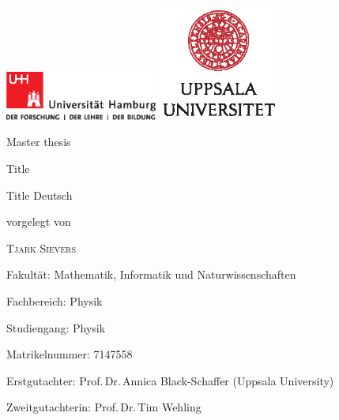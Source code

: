 \documentclass[main.tex]{subfiles}
\begin{document}
\begin{fullsizetitle}
    \vspace{2cm}
    \hspace{0.1\textwidth}
    \vline\hspace{10pt}
    \begin{minipage}[t][0.8\textheight][t]{0.8\textwidth}
        \includegraphics[width=5cm, valign=c]{images/logos/up-uhh-logo-u-2010-u-farbe-u-cmyk}
        \includegraphics[width=4cm, valign=c]{images/logos/UU_logo_CMYK}\par
        \vspace{1\baselineskip}

    \begin{FlushLeft}
        {\Large\textcolor{UHHred}{Master thesis}\par}

        {\Huge Title\par}

       \vspace{1\baselineskip}
        
        {\Large Title Deutsch\par}

        \vspace{4\baselineskip}

        vorgelegt von

        {\Large\textsc{Tjark Sievers}\par}
    \end{FlushLeft}

    \vfill
    
    \begin{FlushLeft}
        Fakultät: Mathematik, Informatik und Naturwissenschaften\par
        Fachbereich: Physik\par
        Studiengang: Physik\par
        Matrikelnummer: 7147558

        Erstgutachter: Prof.\,Dr.\,Annica Black-Schaffer (Uppsala University) \par
        Zweitgutachterin: Prof.\,Dr.\,Tim Wehling \par
    \end{FlushLeft}
    \end{minipage}
\end{fullsizetitle}
\end{document}
